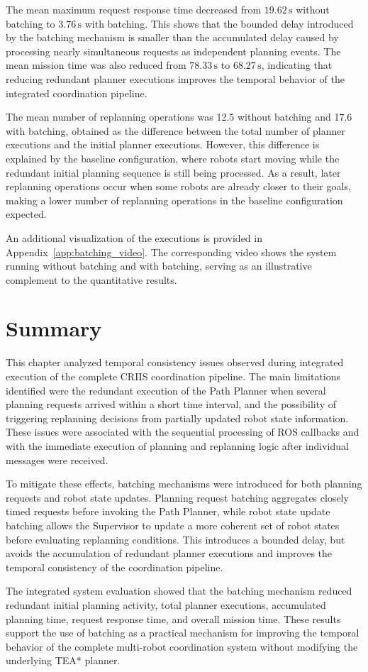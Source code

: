 The mean maximum request response time decreased from \(19.62\,\mathrm{s}\) without batching to
\(3.76\,\mathrm{s}\) with batching. This shows that the bounded delay introduced by the batching
mechanism is smaller than the accumulated delay caused by processing nearly simultaneous
requests as independent planning events. The mean mission time was also reduced from
\(78.33\,\mathrm{s}\) to \(68.27\,\mathrm{s}\), indicating that reducing redundant planner executions
improves the temporal behavior of the integrated coordination pipeline.

The mean number of replanning operations was 12.5 without batching and 17.6 with batching,
obtained as the difference between the total number of planner executions and the initial planner
executions. However, this difference is explained by the baseline configuration, where robots start
moving while the redundant initial planning sequence is still being processed. As a result, later
replanning operations occur when some robots are already closer to their goals, making a lower
number of replanning operations in the baseline configuration expected.

An additional visualization of the executions is provided in Appendix~\ref{app:batching_video}. The
corresponding video shows the system running without batching and with batching, serving as an
illustrative complement to the quantitative results.

\section{Summary}
\label{sec:temporal_consistency_batching_summary}
\hspace{\parindent}
This chapter analyzed temporal consistency issues observed during integrated execution of the
complete CRIIS coordination pipeline. The main limitations identified were the redundant execution
of the Path Planner when several planning requests arrived within a short time interval, and the
possibility of triggering replanning decisions from partially updated robot state information. These
issues were associated with the sequential processing of ROS callbacks and with the immediate
execution of planning and replanning logic after individual messages were received.

To mitigate these effects, batching mechanisms were introduced for both planning requests and
robot state updates. Planning request batching aggregates closely timed requests before invoking
the Path Planner, while robot state update batching allows the Supervisor to update a more coherent
set of robot states before evaluating replanning conditions. This introduces a bounded delay, but
avoids the accumulation of redundant planner executions and improves the temporal consistency of
the coordination pipeline.

The integrated system evaluation showed that the batching mechanism reduced redundant initial
planning activity, total planner executions, accumulated planning time, request response time, and
overall mission time. These results support the use of batching as a practical mechanism for
improving the temporal behavior of the complete multi-robot coordination system without
modifying the underlying TEA* planner.